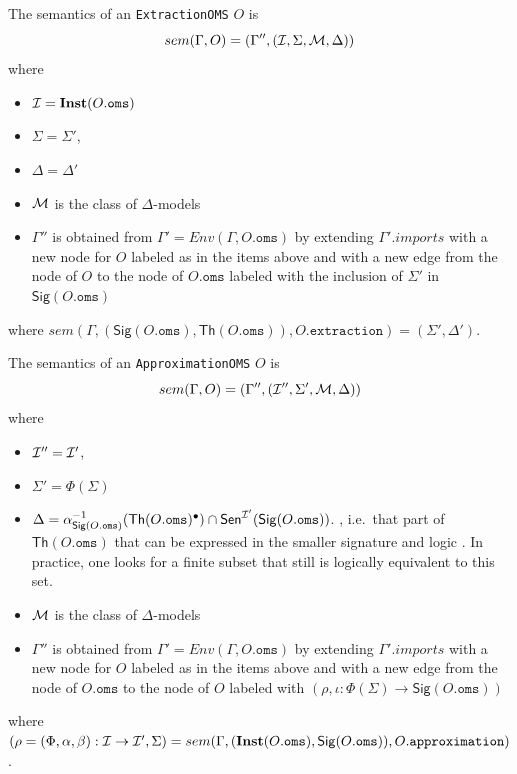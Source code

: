 \documentclass[10pt,fleqn,final]{scrreprt}
\newcommand*{\syntax}[1]{\texttt{#1}}
\newcommand{\Sig}{\mathsf{Sig}}
\renewcommand{\Th}{\mathsf{Th}}
\newcommand{\Inst}{\ensuremath{\mathbf{Inst}}}
\newenvironment{definitions}[0]{\medskip }{}
\begin{document}
\begin{definitions}
The semantics of an \syntax{ExtractionOMS} $O$
is
$$sem(\Gamma, O) = (\Gamma'',({\cal I},\Sigma,{\cal M},\Delta))$$
\noindent where
\begin{itemize}
  \item $\cI = \Inst(O.\syntax{oms})$
  \item $\Sigma = \Sigma'$,
  \item $\Delta = \Delta'$
  \item ${\cal M}$ is the class of $\Delta$-models
  \item $\Gamma''$ is obtained from 
       $\Gamma' = Env(\Gamma, O.\syntax{oms})$
       by extending $\Gamma'.imports$
        with a new node for $O$ labeled as in the items above
        and with a new edge from the node of $O$ to the node of 
        $O.\syntax{oms}$ labeled with
        the inclusion of $\Sigma'$ in $\Sig(O.\syntax{oms})$
\end{itemize}
where 
$sem(\Gamma, (\Sig(O.\syntax{oms}), \Th(O.\syntax{oms})), O.\syntax{extraction}) = 
(\Sigma',\Delta')$.

The semantics of an \syntax{ApproximationOMS} $O$ is
$$sem(\Gamma, O) = (\Gamma'',({\cal I}'',\Sigma',{\cal M},\Delta))$$
\noindent where
\begin{itemize}
  \item ${\cal I}'' = {\cal I}'$,
  \item $\Sigma' = \Phi(\Sigma)$
  \item $\Delta = \alpha^{-1}_{\Sig(O.\syntax{oms})}(\Th(O.\syntax{oms})^\bullet)\cap\Sen^{\cI'}(\Sig(O.\syntax{oms}))$.
, i.e.\ that part of $\Th(O.\syntax{oms})$ that can be expressed in the smaller signature and logic . In  practice, one looks for a finite subset that still is logically equivalent to this set.
  \item ${\cal M}$ is the class of $\Delta$-models
  \item $\Gamma''$ is obtained from 
       $\Gamma' = Env(\Gamma, O.\syntax{oms})$
       by extending $\Gamma'.imports$
        with a new node for $O$ labeled as in the items above
        and with a new edge from the node of $O.\syntax{oms}$ to the node of $O$ 
        labeled with $(\rho,\iota: \Phi(\Sigma) \to \Sig(O.\syntax{oms}))$ 
\end{itemize}
\noindent where $(\rho = (\Phi,\alpha,\beta):\cI\to\cI',\Sigma) = sem(\Gamma, (\Inst(O.\syntax{oms}), \Sig(O.\syntax{oms})), O.\syntax{approximation})$.


\end{definitions}
\end{document}
